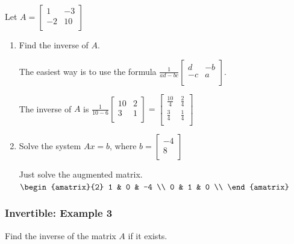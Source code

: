 \documentclass[12pt, letterpaper]{article}
\begin{document}
Let $ A =
\begin{bmatrix}
  1 & -3 \\
  -2 & 10 \\
\end{bmatrix} $
\begin{enumerate}
  \item Find the inverse of $ A $.
    \bigskip

    The easiest way is to use the formula $\displaystyle \frac{1}{ad - bc}
    \begin{bmatrix}
      d & -b \\
      -c & a \\
    \end{bmatrix} $.
    \bigskip

    The inverse of $ A $ is $\displaystyle \frac{1}{10 - 6}
    \begin{bmatrix}
      10 & 2 \\
      3 & 1 \\
    \end{bmatrix} =
    \begin{bmatrix}
      \frac{10}{4} & \frac{2}{4} \\
      \frac{3}{4} & \frac{1}{4} \\
    \end{bmatrix} $
  \item Solve the system $ Ax = b $, where $ b =
    \begin{bmatrix}
      -4 \\ 8 \\
    \end{bmatrix} $
    \bigskip

    Just solve the augmented matrix.
    $
    \begin{amatrix}{2}
      1 & 0 & -4 \\
      0 & 1 & 0 \\
    \end{amatrix} $
\end{enumerate}

\subsubsection*{Invertible: Example 3}

Find the inverse of the matrix $ A $ if it exists.
\end{document}
